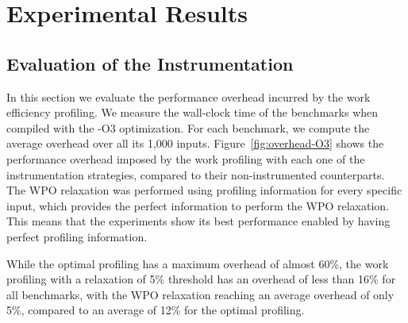 \section{Experimental Results}


\subsection{Evaluation of the Instrumentation}

In this section we evaluate the performance overhead incurred by the work efficiency profiling.
We measure the wall-clock time of the benchmarks when compiled with the {\flagstype -O3} optimization.
For each benchmark, we compute the average overhead over all its 1,000 inputs.
Figure~\ref{fig:overhead-O3} shows the performance overhead imposed by the work
profiling with each one of the instrumentation strategies, compared to their
non-instrumented counterparts.
The WPO relaxation was performed using profiling information for every specific
input, which provides the perfect information to perform the WPO relaxation.
This means that the experiments show its best performance enabled by having
perfect profiling information.


While the optimal profiling has a maximum overhead of almost 60\%,
the work profiling with a relaxation of 5\% threshold has an overhead of less
than 16\% for all benchmarks,
with the WPO relaxation reaching an average overhead of only 5\%,
compared to an average of 12\% for the optimal profiling.

